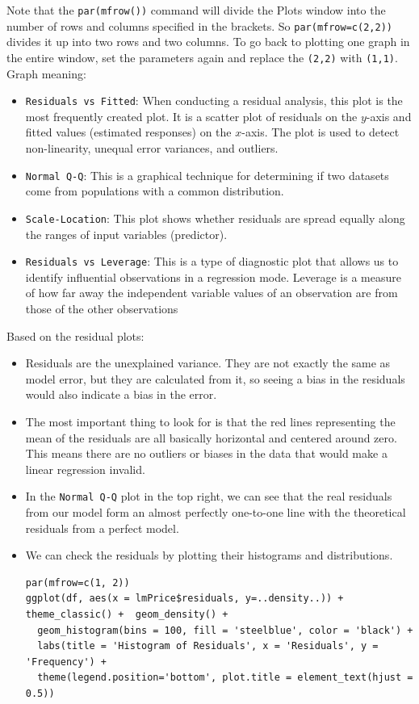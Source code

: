 \documentclass[a4paper]{article}
\begin{document}
Note that the \verb|par(mfrow())| command will divide the Plots window into the number of rows and columns specified in the brackets. So \verb|par(mfrow=c(2,2))| divides it up into two rows and two columns. To go back to plotting one graph in the entire window, set the parameters again and replace the \verb|(2,2)| with \verb|(1,1)|.\\
Graph meaning:
\begin{itemize}
    \item \verb|Residuals vs Fitted|: When conducting a residual analysis, this plot is the most frequently created plot. It is a scatter plot of residuals on the $y$-axis and fitted values (estimated responses) on the $x$-axis. The plot is used to detect non-linearity, unequal error variances, and outliers.
    \item \verb|Normal Q-Q|: This is a graphical technique for determining if two datasets come from populations with a common distribution.
    \item \verb|Scale-Location|: This plot shows whether residuals are spread equally along the ranges of input variables (predictor).
    \item \verb|Residuals vs Leverage|: This is a type of diagnostic plot that allows us to identify influential observations in a regression mode. Leverage is a measure of how far away the independent variable values of an observation are from those of the other observations
\end{itemize}
Based on the residual plots:
\begin{itemize}
    \item Residuals are the unexplained variance. They are not exactly the same as model error, but they are calculated from it, so seeing a bias in the residuals would also indicate a bias in the error.
    \item The most important thing to look for is that the red lines representing the mean of the residuals are all basically horizontal and centered around zero. This means there are no outliers or biases in the data that would make a linear regression invalid.
    \item In the \verb|Normal Q-Q| plot in the top right, we can see that the real residuals from our model form an almost perfectly one-to-one line with the theoretical residuals from a perfect model.
    \item We can check the residuals by plotting their histograms and distributions.
\begin{mdframed}[leftline=false,rightline=false,backgroundcolor=lightblue!10,nobreak=false]
    \begin{verbatim}
par(mfrow=c(1, 2))
ggplot(df, aes(x = lmPrice$residuals, y=..density..)) + theme_classic() +  geom_density() +
  geom_histogram(bins = 100, fill = 'steelblue', color = 'black') + 
  labs(title = 'Histogram of Residuals', x = 'Residuals', y = 'Frequency') +
  theme(legend.position='bottom', plot.title = element_text(hjust = 0.5)) 
    \end{verbatim}
\end{mdframed}
\end{itemize}
\end{document}
